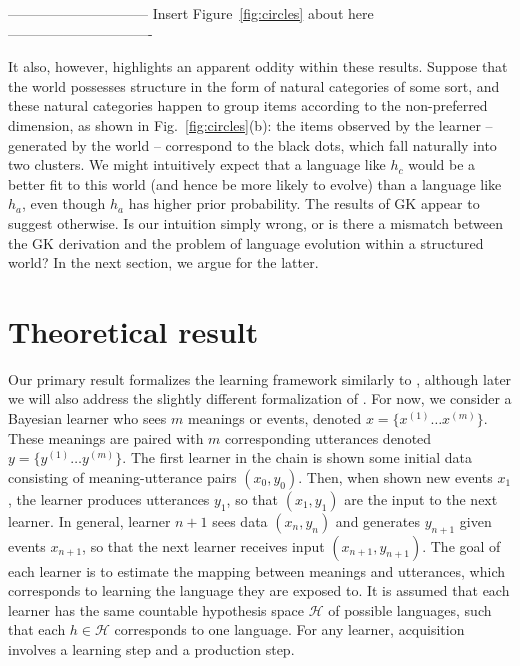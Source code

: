 \documentclass{apa}
\begin{document}
\vspace{5mm}
------------------------------ Insert Figure~\ref{fig:circles} about here -------------------------------
\vspace{5mm}

It also, however, highlights an apparent oddity within these results. Suppose that the world possesses structure in the form of natural categories of some sort, and these natural categories happen to group items according to the non-preferred dimension, as shown in Fig.~\ref{fig:circles}(b): the items observed by the learner -- generated by the world -- correspond to the black dots, which fall naturally into two clusters. We might intuitively expect that a language like $h_c$ would be a better fit to this world (and hence be more likely to evolve) than a language like $h_a$, even though $h_a$ has higher prior probability. The results of GK appear to suggest otherwise. Is our intuition simply wrong, or is there a mismatch between the GK derivation and the problem of language evolution within a structured world? In the next section, we argue for the latter.

\section{Theoretical result}

Our primary result formalizes the learning framework similarly to , although later we will also address the slightly different formalization of . For now, we consider a Bayesian learner who sees $m$ meanings or events, denoted $x = \{x^{(1)}\ldots x^{(m)}\}$. These meanings are paired with $m$ corresponding utterances denoted $y = \{y^{(1)}\ldots y^{(m)}\}$.  The first learner in the chain is shown some initial data consisting of meaning-utterance pairs $(x_0,y_0)$.
Then, when shown new events $x_1$, the learner produces utterances $y_1$, so that $(x_1,y_1)$ are the input to the next learner. In general, learner $n+1$ sees data $(x_n,y_n)$ and generates $y_{n+1}$ given events $x_{n+1}$, so that the next learner receives input $(x_{n+1},y_{n+1})$. The goal of each learner is to estimate the mapping between meanings and utterances, which corresponds to learning the language they are exposed to.
It is assumed that each learner has the same countable hypothesis space $\mathcal{H}$ of possible languages, such that each $h \in \mathcal{H}$ corresponds to one language. For any learner, acquisition involves a learning step and a production step.
\end{document}
